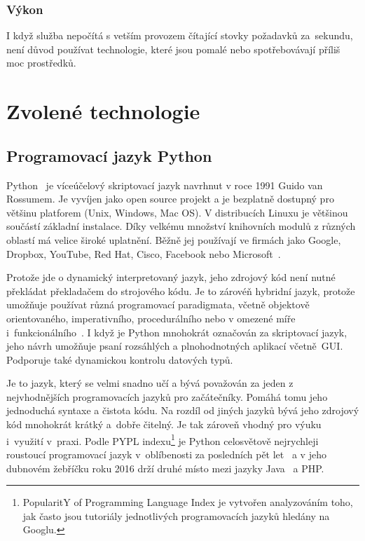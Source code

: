 \subsubsection*{Výkon}
I když služba nepočítá s vetším provozem čítající stovky požadavků za~sekundu, není důvod používat technologie, které jsou pomalé
nebo spotřebovávají příliš moc prostředků.

\section{Zvolené technologie}

\subsection{Programovací jazyk Python}

Python~\cite{python} je víceúčelový skriptovací jazyk navrhnut v roce 1991 \cite{python_year} Guido van Rossumem.
Je vyvíjen jako open source projekt a je bezplatně dostupný pro většinu platforem (Unix, Windows, Mac OS).
V distribucích Linuxu je většinou součástí základní instalace. Díky velkému množství knihovních modulů z různých oblastí
má velice široké uplatnění. Běžně jej používají ve firmách jako Google, Dropbox, YouTube, Red Hat, Cisco,
Facebook nebo Microsoft~\cite{python_companies}.

Protože jde o dynamický interpretovaný jazyk, jeho zdrojový kód není nutné překládat překladačem do strojového kódu.
Je to zárovéň hybridní jazyk, protože umožňuje používat různá programovací paradigmata, včetně objektově orientovaného,
imperativního, procedurálního nebo v omezené míře i~funkcionálního~\cite{python_about}. I když je Python mnohokrát označován za skriptovací jazyk,
jeho návrh umožňuje psaní rozsáhlých a plnohodnotných aplikací včetně~GUI. Podporuje také dynamickou kontrolu datových typů.

Je to jazyk, který se velmi snadno učí a bývá považován za jeden z nejvhodnějších programovacích jazyků pro začátečníky.
Pomáhá tomu jeho jednoduchá syntaxe a čistota kódu. Na rozdíl od jiných jazyků bývá jeho zdrojový kód mnohokrát krátký a~dobře čitelný.
Je tak zároveň vhodný pro výuku i~využití v~praxi. Podle PYPL indexu\footnote{PopularitY of Programming Language Index je vytvořen analyzováním toho,
jak často jsou tutoriály jednotlivých programovacích jazyků hledány na Googlu.} je Python celosvětově nejrychleji roustoucí programovací jazyk
v~oblíbenosti za posledních pět let~\cite{python_pypl} a v jeho dubnovém žebříčku roku 2016 drží druhé místo mezi jazyky Java~\cite{java} a PHP.

